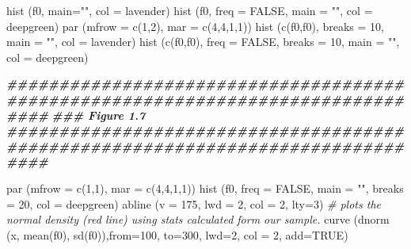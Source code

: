 \documentclass[
]{book}
\newenvironment{Shaded}{\begin{snugshade}}{\end{snugshade}}
\newcommand{\AttributeTok}[1]{\textcolor[rgb]{0.77,0.63,0.00}{#1}}
\newcommand{\CommentTok}[1]{\textcolor[rgb]{0.56,0.35,0.01}{\textit{#1}}}
\newcommand{\ConstantTok}[1]{\textcolor[rgb]{0.00,0.00,0.00}{#1}}
\newcommand{\DecValTok}[1]{\textcolor[rgb]{0.00,0.00,0.81}{#1}}
\newcommand{\DocumentationTok}[1]{\textcolor[rgb]{0.56,0.35,0.01}{\textbf{\textit{#1}}}}
\newcommand{\FunctionTok}[1]{\textcolor[rgb]{0.00,0.00,0.00}{#1}}
\newcommand{\NormalTok}[1]{#1}
\newcommand{\StringTok}[1]{\textcolor[rgb]{0.31,0.60,0.02}{#1}}
\begin{document}
\begin{Shaded}
\begin{Highlighting}[]
\FunctionTok{hist}\NormalTok{ (f0, }\AttributeTok{main=}\StringTok{""}\NormalTok{, }\AttributeTok{col =}\NormalTok{ lavender)}
\FunctionTok{hist}\NormalTok{ (f0, }\AttributeTok{freq =} \ConstantTok{FALSE}\NormalTok{, }\AttributeTok{main =} \StringTok{""}\NormalTok{, }\AttributeTok{col =}\NormalTok{ deepgreen)}
\FunctionTok{par}\NormalTok{ (}\AttributeTok{mfrow =} \FunctionTok{c}\NormalTok{(}\DecValTok{1}\NormalTok{,}\DecValTok{2}\NormalTok{), }\AttributeTok{mar =} \FunctionTok{c}\NormalTok{(}\DecValTok{4}\NormalTok{,}\DecValTok{4}\NormalTok{,}\DecValTok{1}\NormalTok{,}\DecValTok{1}\NormalTok{))}
\FunctionTok{hist}\NormalTok{ (}\FunctionTok{c}\NormalTok{(f0,f0), }\AttributeTok{breaks =} \DecValTok{10}\NormalTok{, }\AttributeTok{main =} \StringTok{""}\NormalTok{, }\AttributeTok{col =}\NormalTok{ lavender)}
\FunctionTok{hist}\NormalTok{ (}\FunctionTok{c}\NormalTok{(f0,f0), }\AttributeTok{freq =} \ConstantTok{FALSE}\NormalTok{, }\AttributeTok{breaks =} \DecValTok{10}\NormalTok{, }\AttributeTok{main =} \StringTok{""}\NormalTok{, }\AttributeTok{col =}\NormalTok{ deepgreen)}

\DocumentationTok{\#\#\#\#\#\#\#\#\#\#\#\#\#\#\#\#\#\#\#\#\#\#\#\#\#\#\#\#\#\#\#\#\#\#\#\#\#\#\#\#\#\#\#\#\#\#\#\#\#\#\#\#\#\#\#\#\#\#\#\#\#\#\#\#\#\#\#\#\#\#\#\#\#\#\#\#\#\#\#\#}
\DocumentationTok{\#\#\# Figure 1.7}
\DocumentationTok{\#\#\#\#\#\#\#\#\#\#\#\#\#\#\#\#\#\#\#\#\#\#\#\#\#\#\#\#\#\#\#\#\#\#\#\#\#\#\#\#\#\#\#\#\#\#\#\#\#\#\#\#\#\#\#\#\#\#\#\#\#\#\#\#\#\#\#\#\#\#\#\#\#\#\#\#\#\#\#\#}

\FunctionTok{par}\NormalTok{ (}\AttributeTok{mfrow =} \FunctionTok{c}\NormalTok{(}\DecValTok{1}\NormalTok{,}\DecValTok{1}\NormalTok{), }\AttributeTok{mar =} \FunctionTok{c}\NormalTok{(}\DecValTok{4}\NormalTok{,}\DecValTok{4}\NormalTok{,}\DecValTok{1}\NormalTok{,}\DecValTok{1}\NormalTok{))}
\FunctionTok{hist}\NormalTok{ (f0, }\AttributeTok{freq =} \ConstantTok{FALSE}\NormalTok{, }\AttributeTok{main =} \StringTok{""}\NormalTok{, }\AttributeTok{breaks =} \DecValTok{20}\NormalTok{, }\AttributeTok{col =}\NormalTok{ deepgreen)}
\FunctionTok{abline}\NormalTok{ (}\AttributeTok{v =} \DecValTok{175}\NormalTok{, }\AttributeTok{lwd =} \DecValTok{2}\NormalTok{, }\AttributeTok{col =} \DecValTok{2}\NormalTok{, }\AttributeTok{lty=}\DecValTok{3}\NormalTok{)}
\CommentTok{\# plots the normal density (red line) using stats calculated form our sample. }
\FunctionTok{curve}\NormalTok{ (}\FunctionTok{dnorm}\NormalTok{ (x, }\FunctionTok{mean}\NormalTok{(f0), }\FunctionTok{sd}\NormalTok{(f0)),}\AttributeTok{from=}\DecValTok{100}\NormalTok{, }\AttributeTok{to=}\DecValTok{300}\NormalTok{, }\AttributeTok{lwd=}\DecValTok{2}\NormalTok{, }\AttributeTok{col =} \DecValTok{2}\NormalTok{, }\AttributeTok{add=}\ConstantTok{TRUE}\NormalTok{)}


\end{Highlighting}
\end{Shaded}
\end{document}
